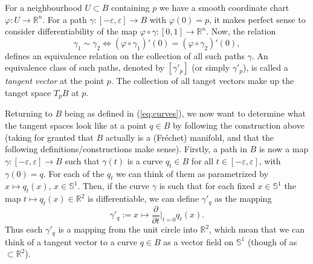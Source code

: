 \documentclass[a4,danish]{article}
\theoremstyle{break}
\theoremstyle{definition}
\theoremstyle{Break}
\newcommand{\R}{\mathbb{R}}
\renewcommand{\S}{\mathbb{S}}
\renewcommand{\phi}{\varphi}
\renewcommand{\epsilon}{\varepsilon}
\begin{document}
For a neighbourhood $U \subset B$ containing $p$ we have a smooth coordinate
chart $\phi\colon U \rightarrow \R^n$. For a path $\gamma \colon
[-\epsilon,\epsilon] \rightarrow B$ with $\phi(0) = p$, it makes perfect sense to consider
differentiability of the map $\phi \circ \gamma \colon
[0,1]\rightarrow \R^n$. Now, the relation
\begin{equation*}
  \gamma_1 \sim \gamma_2 \iff
  (\phi \circ \gamma_1)'(0) = (\phi \circ \gamma_2)'(0),
\end{equation*}
defines an equivalence relation on the collection of all such paths
$\gamma$. An equivalence class of such paths, denoted by $[\gamma'_p]$ (or simply
$\gamma'_p$), is called a \textit{tangent vector}
at the point $p$. The collection of all tanget vectors make up the
tanget space $T_pB$ at $p$.

Returning to $B$ being as defined in (\ref{eq:curves}), we now
want to determine what the tangent spaces look like at a point $q \in B$ by
following the construction above (taking for
granted that $B$ actually is a (Fr\'echet) manifold, and
that the following definitions/constructions make sense). Firstly, a
path in $B$ is now a map $\gamma\colon [-\epsilon,\epsilon] \rightarrow B$ such that
$\gamma(t)$ is a curve $q_t \in B$ for all $t \in
[-\epsilon,\epsilon]$, with $\gamma(0) =q$. For each of the $q_t$ we
can think of them as parametrized by $x \mapsto q_t(x)$, $x \in
\S^1$. Then, if the curve $\gamma$ is such that for each fixed
$x \in \S^1 $ the map $t \mapsto q_{t}(x) \in \R^2$ is differentiable,
we can define $\gamma'_q$ as the mapping
\begin{equation*}
  \gamma'_q := x \mapsto \frac{\partial }{\partial t} \bigg\vert_{t=0}q_t(x).
\end{equation*}
Thus each $\gamma'_q$ is a mapping from the unit circle into $\R^2$,
which mean that we can think of a tangent vector to a curve $q \in B$
as a vector field on $\S^1$ (though of as $\subset \R^2$).
\end{document}
